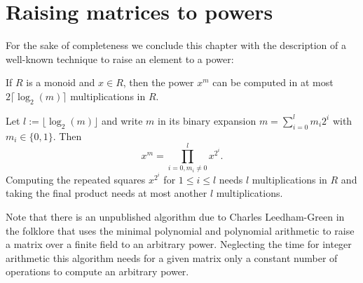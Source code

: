 \section{Raising matrices to powers}

For the sake of completeness we conclude this chapter with the description
of a well-known technique to raise an element to a power:

\begin{Lemm}[Powering up]
If $R$ is a monoid and $x \in R$, then the power $x^m$ can be computed
in at most $2\lceil\log_2(m)\rceil$ multiplications in $R$.
\end{Lemm}
\proofbeg
Let $l := \lfloor\log_2(m)\rfloor$ and write $m$ in its binary expansion 
$m = \sum_{i=0}^l m_i 2^i$ with $m_i \in \{0,1\}$. Then
\[ x^m = \prod_{i=0, m_i \neq 0}^l x^{2^i}. \]
Computing the repeated squares $x^{2^i}$ for $1 \le i \le l$ needs $l$
multiplications in $R$ and taking the final product needs at most
another $l$ multiplications.
\proofend

\begin{Rem}
Note that there is an unpublished algorithm due to Charles Leedham-Green
in the folklore that uses the minimal polynomial and polynomial arithmetic
to raise a matrix over a finite field to an arbitrary power. Neglecting 
the time for integer arithmetic this algorithm needs for a given matrix
only a constant number of operations to compute an arbitrary power.
\end{Rem}
